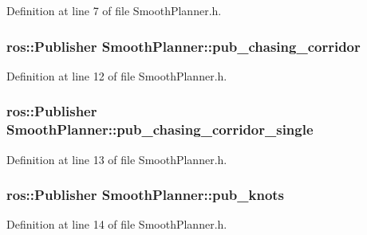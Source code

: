 Definition at line 7 of file Smooth\+Planner.\+h.

\subsubsection[{\texorpdfstring{pub\+\_\+chasing\+\_\+corridor}{pub_chasing_corridor}}]{\setlength{\rightskip}{0pt plus 5cm}ros\+::\+Publisher Smooth\+Planner\+::pub\+\_\+chasing\+\_\+corridor}\hypertarget{class_smooth_planner_a7cd9de34963f445a21a6d0101346b071}{}\label{class_smooth_planner_a7cd9de34963f445a21a6d0101346b071}


Definition at line 12 of file Smooth\+Planner.\+h.

\subsubsection[{\texorpdfstring{pub\+\_\+chasing\+\_\+corridor\+\_\+single}{pub_chasing_corridor_single}}]{\setlength{\rightskip}{0pt plus 5cm}ros\+::\+Publisher Smooth\+Planner\+::pub\+\_\+chasing\+\_\+corridor\+\_\+single}\hypertarget{class_smooth_planner_a2f023865c692f4fdaa830204fc533018}{}\label{class_smooth_planner_a2f023865c692f4fdaa830204fc533018}


Definition at line 13 of file Smooth\+Planner.\+h.

\subsubsection[{\texorpdfstring{pub\+\_\+knots}{pub_knots}}]{\setlength{\rightskip}{0pt plus 5cm}ros\+::\+Publisher Smooth\+Planner\+::pub\+\_\+knots}\hypertarget{class_smooth_planner_a7ee67bceac6d60409542a2250b2ccd08}{}\label{class_smooth_planner_a7ee67bceac6d60409542a2250b2ccd08}


Definition at line 14 of file Smooth\+Planner.\+h.

